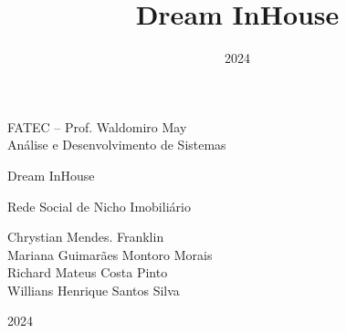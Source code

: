 \documentclass[a4paper,12pt]{article}
\title{{\Huge Dream InHouse}}
\author{
}
\date{2024}
\begin{document}
\begin{titlingpage}
    \begin{center}
        \large
            {\Huge
                FATEC -- Prof. Waldomiro May
            }\\
            Análise e Desenvolvimento de Sistemas

            \vspace{3cm}

            \vspace{1cm}
            {\Huge
                Dream InHouse
            }

            Rede Social de Nicho Imobiliário

            \vspace{5cm}
            {
                Chrystian Mendes. Franklin\\
                Mariana Guimarães Montoro Morais\\
                Richard Mateus Costa Pinto\\
                Willians Henrique Santos Silva
            }

            \vspace{2cm}
            2024
        \normalsize
    \end{center}
\end{titlingpage}
\end{document}
